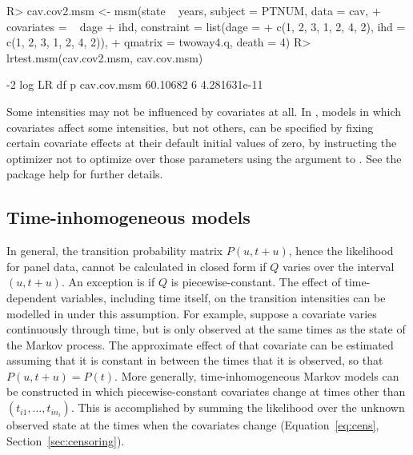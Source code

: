\documentclass[article,shortnames]{jss}
\begin{document}
\begin{CodeChunk}
\begin{CodeInput}
R> cav.cov2.msm <- msm(state ~ years, subject = PTNUM, data = cav,
+    covariates = ~ dage + ihd, constraint = list(dage =
+    c(1, 2, 3, 1, 2, 4, 2), ihd = c(1, 2, 3, 1, 2, 4, 2)),
+    qmatrix = twoway4.q, death = 4)
R> lrtest.msm(cav.cov2.msm, cav.cov.msm)
\end{CodeInput}
\begin{CodeOutput}
            -2 log LR df            p
cav.cov.msm  60.10682  6 4.281631e-11
\end{CodeOutput}
\end{CodeChunk}

Some intensities may not be influenced by covariates at all.  In
, models in which covariates affect some intensities, but not
others, can be specified by fixing certain covariate effects at their
default initial values of zero, by instructing the optimizer not to
optimize over those parameters using the  argument to
. See the package help for further details.


\subsection{Time-inhomogeneous models}
\label{sec:inhomog}

In general, the transition probability matrix $P(u, t+u)$, hence the
likelihood for panel data, cannot be calculated in closed form if $Q$
varies over the interval $(u, t+u)$.  An exception is if $Q$ is
piecewise-constant.  The effect of time-dependent variables, including
time itself, on the transition intensities can be modelled in
 under this assumption.  For example, suppose a covariate
varies continuously through time, but is only observed at the same
times as the state of the Markov process.  The approximate effect of
that covariate can be estimated assuming that it is constant in
between the times that it is observed, so that $P(u, t+u)=P(t)$.  More
generally, time-inhomogeneous Markov models can be constructed in
which piecewise-constant covariates change at times other than
$(t_{i1}, \ldots, t_{in_i})$.  This is accomplished by summing the
likelihood over the unknown observed state at the times when the
covariates change (Equation~\ref{eq:cens}, Section~\ref{sec:censoring}).
\end{document}
